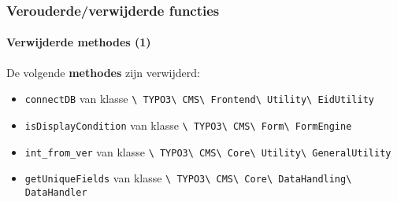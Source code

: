 \begin{frame}[fragile]
	\frametitle{Verouderde/verwijderde functies}
	\framesubtitle{Verwijderde methodes (1)}

	De volgende \textbf{methodes} zijn verwijderd:

	\begin{itemize}
		\item
			\small
				\texttt{connectDB}\newline
				van klasse
				\texttt{\textbackslash
					TYPO3\textbackslash
					CMS\textbackslash
					Frontend\textbackslash
					Utility\textbackslash
					EidUtility}
			\normalsize
		\item
			\small
				\texttt{isDisplayCondition}\newline
				van klasse
				\texttt{\textbackslash
					TYPO3\textbackslash
					CMS\textbackslash
					Form\textbackslash
					FormEngine}
			\normalsize
		\item
			\small
				\texttt{int\_from\_ver}\newline
				van klasse
				\texttt{\textbackslash
					TYPO3\textbackslash
					CMS\textbackslash
					Core\textbackslash
					Utility\textbackslash
					GeneralUtility}
			\normalsize
		\item
			\small
				\texttt{getUniqueFields}\newline
				van klasse
				\texttt{\textbackslash
					TYPO3\textbackslash
					CMS\textbackslash
					Core\textbackslash
					DataHandling\textbackslash
					DataHandler}
			\normalsize

	\end{itemize}

\end{frame}


